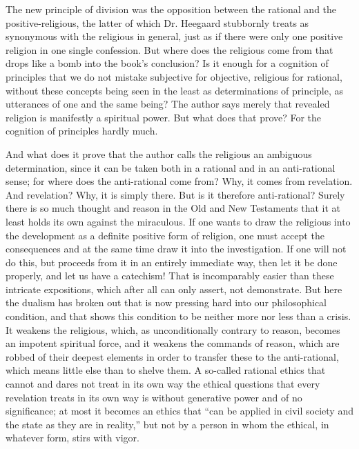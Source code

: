 \documentclass[12pt,a4paper,openany]{book}
\newcommand{\opage}[1]{\marginnote{\footnotesize\textit{[#1]}}}
\begin{document}
The new principle of division was the opposition between the rational and
the positive-religious, the latter of which Dr. Heegaard stubbornly treats
as synonymous with the religious in general, just as if there were only
one positive religion in one single confession. But where does the
religious come from that drops like a bomb into the book's conclusion? Is
it enough for a cognition of principles that we do not mistake subjective
for objective, religious for rational, without these concepts being seen in
the least as determinations of principle, as utterances of one and the same
being? The author says merely that revealed religion is manifestly a
spiritual power. But what does that prove? For the cognition of principles
hardly much.

And what does it prove that the author calls the religious an ambiguous
determination, since it can be taken both in a rational and in an
anti-rational sense; for where does the anti-rational come from? Why, it
comes from revelation. And revelation? Why, it is simply there. But is it
therefore anti-rational? Surely there is so much thought and reason in the
Old and New Testaments that it at least holds its own against the
miraculous. If one wants to draw the religious into the development as a
definite positive form of religion, one must accept the consequences and at
the same time draw it into the investigation. If one will not do this, but
proceeds from it in an entirely immediate way, then let it be done
properly, and let us have a catechism! That is incomparably easier than
these intricate expositions, which after all can only assert, not
demonstrate. But here the dualism has broken out that is now pressing hard
into our philosophical condition, and that shows this condition to be
neither more nor less than a crisis. It weakens the religious, which, as
\opage{31}unconditionally contrary to reason, becomes an impotent spiritual
force, and it weakens the commands of reason, which are robbed of their
deepest elements in order to transfer these to the anti-rational, which
means little else than to shelve them. A so-called rational ethics that
cannot and dares not treat in its own way the ethical questions that every
revelation treats in its own way is without generative power and of no
significance; at most it becomes an ethics that ``can be applied in civil
society and the state as they are in reality,'' but not by a person in whom
the ethical, in whatever form, stirs with vigor.
\end{document}
